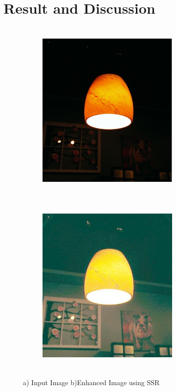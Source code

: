 \chapter{Result and Discussion}

\begin{figure}
	\begin{subfigure}{8cm}
		\centering    
    	\includegraphics[width=7cm,height=9cm,keepaspectratio]{images/ch5/bulb_input.jpg}
    	\caption{} 
    \end{subfigure}
  	\begin{subfigure}{6cm}
  		\centering
  		\includegraphics[width=7cm,height=9cm,keepaspectratio]{images/ch5/bulb_ssr.jpg}
   		\caption{}
  	\end{subfigure}
  	\caption{a) Input Image b)Enhanced Image using SSR}
  	\label{fig:ssr}
\end{figure}


